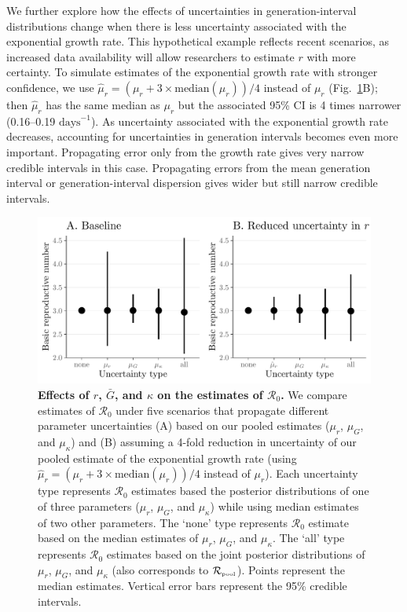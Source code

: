 \documentclass[12pt]{article}
\newcommand{\fref}[1]{Fig.~\ref{fig:#1}}
\newcommand{\Ro}{\ensuremath{{\mathcal R}_{0}}\xspace}
\newcommand{\Rpool}{\ensuremath{{\mathcal R}_{\textrm{\tiny{pool}}}}\xspace}
\begin{document}
We further explore how the effects of uncertainties in generation-interval distributions change when there is less uncertainty associated with the exponential growth rate.
This hypothetical example reflects recent scenarios, as increased data availability will allow researchers to estimate $r$ with more certainty.
To simulate estimates of the exponential growth rate with stronger confidence, we use $\hat{\mu}_r = (\mu_r + 3\times\mathrm{median}(\mu_r))/4$ instead of $\mu_r$ (\fref{eff}B); 
then $\hat{\mu}_r$ has the same median as $\mu_r$ but the associated 95\% CI is 4 times narrower (0.16--0.19 $\textrm{days}^{-1}$).
As uncertainty associated with the exponential growth rate decreases, accounting for uncertainties in generation intervals becomes even more important.
Propagating error only from the growth rate gives very narrow credible intervals in this case. 
Propagating errors from the mean generation interval or generation-interval dispersion gives wider but still narrow credible intervals.

\begin{figure}[!ht]
\includegraphics[width=\textwidth]{figure2.pdf}
\caption{
  \textbf{Effects of $r$, $\bar G$, and $\kappa$ on the estimates of \Ro.}
We compare estimates of \Ro under five scenarios that propagate different parameter uncertainties (A) based on our pooled estimates ($\mu_r$, $\mu_G$, and $\mu_\kappa$) and (B) assuming a 4-fold reduction in uncertainty of our pooled estimate of the exponential growth rate (using $\hat{\mu}_r = (\mu_r + 3\times\mathrm{median}(\mu_r))/4$ instead of $\mu_r$).
Each uncertainty type represents \Ro estimates based the posterior distributions of one of three parameters ($\mu_r$, $\mu_G$, and $\mu_\kappa$) while using median estimates of two other parameters.
The `none' type represents \Ro estimate based on the median estimates of $\mu_r$, $\mu_G$, and $\mu_\kappa$.
The `all' type represents \Ro estimates based on the joint posterior distributions of  $\mu_r$, $\mu_G$, and $\mu_\kappa$ (also corresponds to \Rpool).
Points represent the median estimates.
Vertical error bars represent the 95\% credible intervals.
}
\label{fig:eff}
\end{figure}
\end{document}
